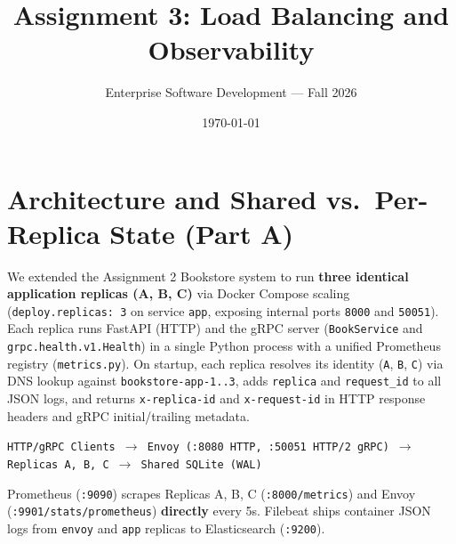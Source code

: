 \documentclass[10pt,a4paper]{article}
\title{\textbf{Assignment 3: Load Balancing and Observability}}
\author{Enterprise Software Development --- Fall 2026}
\date{\today}
\begin{document}
\maketitle

\section{Architecture and Shared vs.\ Per-Replica State (Part A)}
We extended the Assignment 2 Bookstore system to run \textbf{three identical application replicas (A, B, C)} via Docker Compose scaling (\texttt{deploy.replicas: 3} on service \texttt{app}, exposing internal ports \texttt{8000} and \texttt{50051}). Each replica runs FastAPI (HTTP) and the gRPC server (\texttt{BookService} and \texttt{grpc.health.v1.Health}) in a single Python process with a unified Prometheus registry (\texttt{metrics.py}). On startup, each replica resolves its identity (\texttt{A}, \texttt{B}, \texttt{C}) via DNS lookup against \texttt{bookstore-app-1..3}, adds \texttt{replica} and \texttt{request\_id} to all JSON logs, and returns \texttt{x-replica-id} and \texttt{x-request-id} in HTTP response headers and gRPC initial/trailing metadata.

\begin{center}
\texttt{HTTP/gRPC Clients $\longrightarrow$ Envoy (:8080 HTTP, :50051 HTTP/2 gRPC) $\longrightarrow$ Replicas A, B, C $\longrightarrow$ Shared SQLite (WAL)}
\end{center}

Prometheus (\texttt{:9090}) scrapes Replicas A, B, C (\texttt{:8000/metrics}) and Envoy (\texttt{:9901/stats/prometheus}) \textbf{directly} every 5s. Filebeat ships container JSON logs from \texttt{envoy} and \texttt{app} replicas to Elasticsearch (\texttt{:9200}).

\begin{table}[H]
\centering
\small
{}
\caption{Shared vs.\ per-replica state analysis.}
\end{table}
\end{document}

